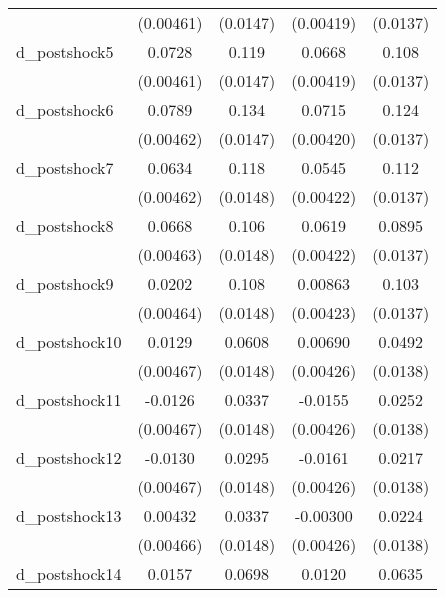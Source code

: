 {\begin{tabular}{l*{4}{c}}
          &(0.00461)         & (0.0147)         &(0.00419)         & (0.0137)         \\
d\_postshock5&   0.0728\sym{***}&    0.119\sym{***}&   0.0668\sym{***}&    0.108\sym{***}\\
          &(0.00461)         & (0.0147)         &(0.00419)         & (0.0137)         \\
d\_postshock6&   0.0789\sym{***}&    0.134\sym{***}&   0.0715\sym{***}&    0.124\sym{***}\\
          &(0.00462)         & (0.0147)         &(0.00420)         & (0.0137)         \\
d\_postshock7&   0.0634\sym{***}&    0.118\sym{***}&   0.0545\sym{***}&    0.112\sym{***}\\
          &(0.00462)         & (0.0148)         &(0.00422)         & (0.0137)         \\
d\_postshock8&   0.0668\sym{***}&    0.106\sym{***}&   0.0619\sym{***}&   0.0895\sym{***}\\
          &(0.00463)         & (0.0148)         &(0.00422)         & (0.0137)         \\
d\_postshock9&   0.0202\sym{***}&    0.108\sym{***}&  0.00863\sym{*}  &    0.103\sym{***}\\
          &(0.00464)         & (0.0148)         &(0.00423)         & (0.0137)         \\
d\_postshock10&   0.0129\sym{**} &   0.0608\sym{***}&  0.00690         &   0.0492\sym{***}\\
          &(0.00467)         & (0.0148)         &(0.00426)         & (0.0138)         \\
d\_postshock11&  -0.0126\sym{**} &   0.0337\sym{*}  &  -0.0155\sym{***}&   0.0252         \\
          &(0.00467)         & (0.0148)         &(0.00426)         & (0.0138)         \\
d\_postshock12&  -0.0130\sym{**} &   0.0295\sym{*}  &  -0.0161\sym{***}&   0.0217         \\
          &(0.00467)         & (0.0148)         &(0.00426)         & (0.0138)         \\
d\_postshock13&  0.00432         &   0.0337\sym{*}  & -0.00300         &   0.0224         \\
          &(0.00466)         & (0.0148)         &(0.00426)         & (0.0138)         \\
d\_postshock14&   0.0157\sym{***}&   0.0698\sym{***}&   0.0120\sym{**} &   0.0635\sym{***}\\

\end{tabular}}

